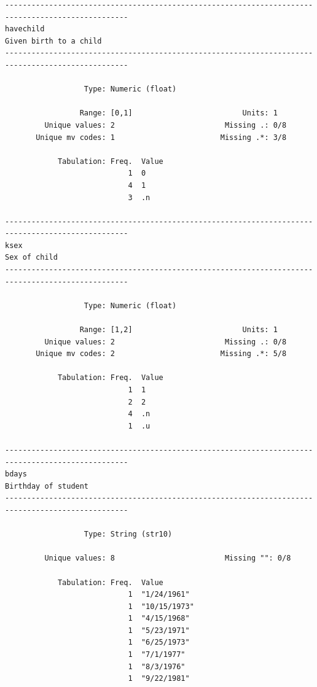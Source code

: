 \documentclass[
]{book}
\begin{document}
\begin{verbatim}
--------------------------------------------------------------------------------------------------
havechild                                                                   Given birth to a child
--------------------------------------------------------------------------------------------------

                  Type: Numeric (float)

                 Range: [0,1]                         Units: 1
         Unique values: 2                         Missing .: 0/8
       Unique mv codes: 1                        Missing .*: 3/8

            Tabulation: Freq.  Value
                            1  0
                            4  1
                            3  .n

--------------------------------------------------------------------------------------------------
ksex                                                                                  Sex of child
--------------------------------------------------------------------------------------------------

                  Type: Numeric (float)

                 Range: [1,2]                         Units: 1
         Unique values: 2                         Missing .: 0/8
       Unique mv codes: 2                        Missing .*: 5/8

            Tabulation: Freq.  Value
                            1  1
                            2  2
                            4  .n
                            1  .u

--------------------------------------------------------------------------------------------------
bdays                                                                          Birthday of student
--------------------------------------------------------------------------------------------------

                  Type: String (str10)

         Unique values: 8                         Missing "": 0/8

            Tabulation: Freq.  Value
                            1  "1/24/1961"
                            1  "10/15/1973"
                            1  "4/15/1968"
                            1  "5/23/1971"
                            1  "6/25/1973"
                            1  "7/1/1977"
                            1  "8/3/1976"
                            1  "9/22/1981"


\end{verbatim}
\end{document}
